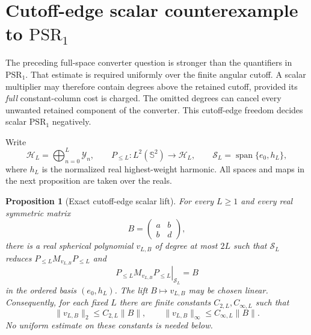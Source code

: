 \documentclass[11pt]{article}
\newtheorem{proposition}[theorem]{Proposition}
\theoremstyle{definition}
\theoremstyle{remark}
\begin{document}
\section{Cutoff-edge scalar counterexample to $\mathrm{PSR}_1$}
\label{app:cutoff-edge-scalar-counterexample}

The preceding full-space converter question is stronger than the quantifiers in
$\mathrm{PSR}_1$.  That estimate is required uniformly over the finite angular
cutoff.  A scalar multiplier may therefore contain degrees above the retained
cutoff, provided its \emph{full} constant-column cost is charged.  The omitted
degrees can cancel every unwanted retained component of the converter.  This
cutoff-edge freedom decides scalar $\mathrm{PSR}_1$ negatively.

Write
\begin{equation}
 \mathcal H_L=\bigoplus_{n=0}^{L}\mathcal Y_n,
 \qquad P_{\leq L}:L^2(\mathbb S^2)\longrightarrow\mathcal H_L,
 \qquad \mathcal S_L=\operatorname{span}\{e_0,h_L\},
 \label{eq:cutoff-edge-spaces}
\end{equation}
where $h_L$ is the normalized real highest-weight harmonic.  All spaces and
maps in the next proposition are taken over the reals.

\begin{proposition}[Exact cutoff-edge scalar lift]
\label{prop:exact-cutoff-edge-lift}
For every $L\geq1$ and every real symmetric matrix
\begin{equation}
 B=\begin{pmatrix}a&b\\b&d\end{pmatrix},
\end{equation}
there is a real spherical polynomial $v_{L,B}$ of degree at most $2L$ such
that $\mathcal S_L$ reduces $P_{\leq L}M_{v_{L,B}}P_{\leq L}$ and
\begin{equation}
 \left.P_{\leq L}M_{v_{L,B}}P_{\leq L}\right|_{\mathcal S_L}=B
 \label{eq:exact-cutoff-edge-block}
\end{equation}
in the ordered basis $(e_0,h_L)$.  The lift $B\mapsto v_{L,B}$ may be chosen
linear.  Consequently, for each fixed $L$ there are finite constants
$C_{2,L},C_{\infty,L}$ such that
\begin{equation}
 \|v_{L,B}\|_2\leq C_{2,L}\|B\|,
 \qquad
 \|v_{L,B}\|_\infty\leq C_{\infty,L}\|B\|.
 \label{eq:cutoff-edge-lift-bounds}
\end{equation}
No uniform estimate on these constants is needed below.
\end{proposition}
\end{document}
